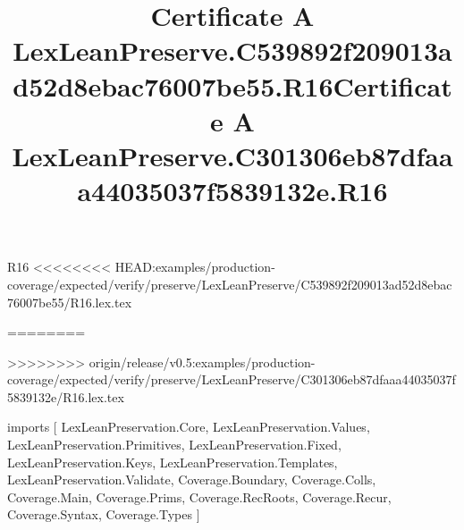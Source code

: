 \begin{lexlean}{R16}
<<<<<<<< HEAD:examples/production-coverage/expected/verify/preserve/LexLeanPreserve/C539892f209013ad52d8ebac76007be55/R16.lex.tex
\title{Certificate A LexLeanPreserve.C539892f209013ad52d8ebac76007be55.R16}
========
\title{Certificate A LexLeanPreserve.C301306eb87dfaaa44035037f5839132e.R16}
>>>>>>>> origin/release/v0.5:examples/production-coverage/expected/verify/preserve/LexLeanPreserve/C301306eb87dfaaa44035037f5839132e/R16.lex.tex
\begin{coremodule}
imports [
  LexLeanPreservation.Core,
  LexLeanPreservation.Values,
  LexLeanPreservation.Primitives,
  LexLeanPreservation.Fixed,
  LexLeanPreservation.Keys,
  LexLeanPreservation.Templates,
  LexLeanPreservation.Validate,
  Coverage.Boundary,
  Coverage.Colls,
  Coverage.Main,
  Coverage.Prims,
  Coverage.RecRoots,
  Coverage.Recur,
  Coverage.Syntax,
  Coverage.Types
]


\end{coremodule}
\end{lexlean}
